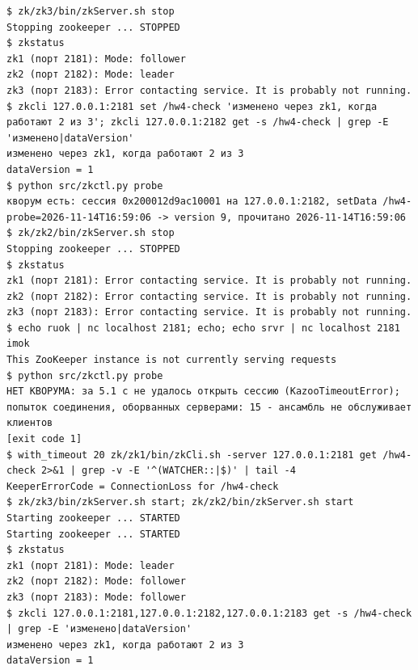 \begin{Verbatim}
$ zk/zk3/bin/zkServer.sh stop
Stopping zookeeper ... STOPPED
$ zkstatus
zk1 (порт 2181): Mode: follower
zk2 (порт 2182): Mode: leader
zk3 (порт 2183): Error contacting service. It is probably not running.
$ zkcli 127.0.0.1:2181 set /hw4-check 'изменено через zk1, когда работают 2 из 3'; zkcli 127.0.0.1:2182 get -s /hw4-check | grep -E 'изменено|dataVersion'
изменено через zk1, когда работают 2 из 3
dataVersion = 1
$ python src/zkctl.py probe
кворум есть: сессия 0x200012d9ac10001 на 127.0.0.1:2182, setData /hw4-probe=2026-11-14T16:59:06 -> version 9, прочитано 2026-11-14T16:59:06
$ zk/zk2/bin/zkServer.sh stop
Stopping zookeeper ... STOPPED
$ zkstatus
zk1 (порт 2181): Error contacting service. It is probably not running.
zk2 (порт 2182): Error contacting service. It is probably not running.
zk3 (порт 2183): Error contacting service. It is probably not running.
$ echo ruok | nc localhost 2181; echo; echo srvr | nc localhost 2181
imok
This ZooKeeper instance is not currently serving requests
$ python src/zkctl.py probe
НЕТ КВОРУМА: за 5.1 с не удалось открыть сессию (KazooTimeoutError); попыток соединения, оборванных серверами: 15 - ансамбль не обслуживает клиентов
[exit code 1]
$ with_timeout 20 zk/zk1/bin/zkCli.sh -server 127.0.0.1:2181 get /hw4-check 2>&1 | grep -v -E '^(WATCHER::|$)' | tail -4
KeeperErrorCode = ConnectionLoss for /hw4-check
$ zk/zk3/bin/zkServer.sh start; zk/zk2/bin/zkServer.sh start
Starting zookeeper ... STARTED
Starting zookeeper ... STARTED
$ zkstatus
zk1 (порт 2181): Mode: leader
zk2 (порт 2182): Mode: follower
zk3 (порт 2183): Mode: follower
$ zkcli 127.0.0.1:2181,127.0.0.1:2182,127.0.0.1:2183 get -s /hw4-check | grep -E 'изменено|dataVersion'
изменено через zk1, когда работают 2 из 3
dataVersion = 1
\end{Verbatim}
